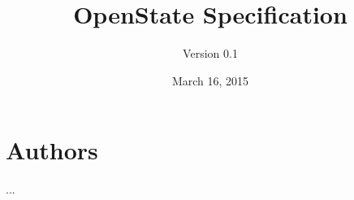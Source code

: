 \documentclass[a4paper,11pt,twoside=semi]{scrreprt}
\title{OpenState Specification}
\subtitle{Version 0.1}
\author{}
\date{March 16, 2015}
\begin{document}
\maketitle


\tableofcontents

\newpage
\clearpage










\section*{Authors}
...

\end{document}
